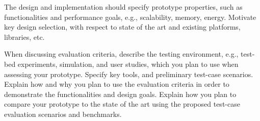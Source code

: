 \documentclass{article}
\begin{document}
The design and implementation should specify prototype properties, such as
functionalities and performance goals, e.g., scalability, memory, energy.
Motivate key design selection, with respect to state of the art and existing
platforms, libraries, etc.  

When discussing evaluation criteria, describe the testing environment, e.g.,
test-bed experiments, simulation, and user studies, which you plan to use when
assessing your prototype. Specify key tools, and preliminary test-case
scenarios. Explain how and why you plan to use the evaluation criteria in order
to demonstrate the functionalities and design goals. Explain how you plan to
compare your prototype to the state of the art using the proposed test-case
evaluation scenarios and benchmarks. 






\end{document}
